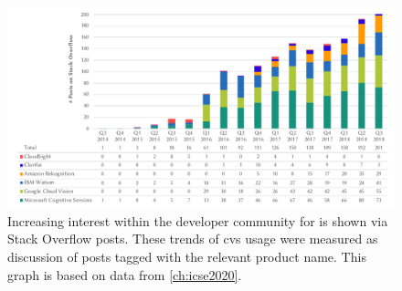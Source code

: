 

\begin{figure}[t!]
\centering
\includegraphics[width=.95\linewidth]{stackoverflow-trends2}
\caption[Increasing interest in the developer community of computer vision services]{Increasing interest within the developer community for  is shown via Stack Overflow posts. These trends of \gls{cvs} usage were measured as discussion of posts tagged with the relevant product name. This graph is based on data from \cref{ch:icse2020}.}
\label{fig:introduction:stackoverflow-trends}
\end{figure}


